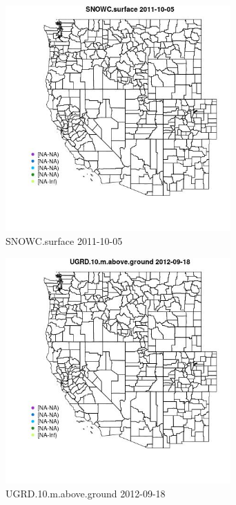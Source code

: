\begin{figure} 
\centering  
\includegraphics[width=0.77\textwidth]{Code_Outputs/ML_input_report_ML_input_PM25_Step5_part_d_de_duplicated_aves_ML_input_MapObsSNOWCsurface2011-10-05.jpg} 
\caption{\label{fig:ML_input_report_ML_input_PM25_Step5_part_d_de_duplicated_aves_ML_inputMapObsSNOWCsurface2011-10-05}SNOWC.surface 2011-10-05} 
\end{figure} 
 

\begin{figure} 
\centering  
\includegraphics[width=0.77\textwidth]{Code_Outputs/ML_input_report_ML_input_PM25_Step5_part_d_de_duplicated_aves_ML_input_MapObsUGRD10maboveground2012-09-18.jpg} 
\caption{\label{fig:ML_input_report_ML_input_PM25_Step5_part_d_de_duplicated_aves_ML_inputMapObsUGRD10maboveground2012-09-18}UGRD.10.m.above.ground 2012-09-18} 
\end{figure} 
 

